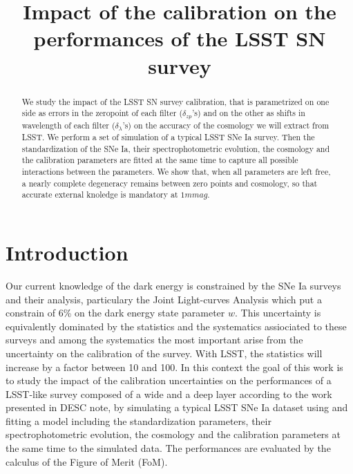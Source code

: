 \documentclass[\docopts]{\docclass}
\begin{document}
\title{ Impact of the calibration on the performances of the LSST SN survey }

\maketitlepre

\begin{abstract}
We study the impact of the LSST SN survey calibration, that is parametrized on one side as errors in the zeropoint of each filter ($\delta_{zp}$'s) and on the other as shifts in wavelength of each filter ($\delta_\lambda$'s) on the accuracy of the cosmology we will extract from LSST.
We perform a set of simulation of a typical LSST SNe Ia survey.
Then the standardization of the SNe Ia, their spectrophotometric evolution, the cosmology and the calibration parameters are fitted at the same time to capture all possible interactions between the parameters.
We show that, when all parameters are left free, a nearly complete degeneracy remains between zero points and cosmology, so that accurate external knoledge is mandatory at $1mmag$.
\end{abstract}


\maketitlepost

% 

\section{Introduction}
\label{sec:intro}

Our current knowledge of the dark energy is constrained by the SNe Ia surveys and their analysis, particulary the Joint Light-curves Analysis \cite{1401.4064} which put a constrain of 6\% on the dark energy state parameter $w$.
This uncertainty is equivalently dominated by the statistics and the systematics assiociated to these surveys and among the systematics the most important arise from the uncertainty on the calibration of the survey.
With LSST, the statistics will increase by a factor between 10 and 100. In this context the goal of this work is to study the impact of the calibration uncertainties on the performances of a LSST-like survey composed of a wide and a deep layer according to the work presented in \cite{SN-CADENCE} DESC note, by simulating a typical LSST SNe Ia dataset using  and fitting a model including the standardization parameters, their spectrophotometric evolution, the cosmology and the calibration parameters at the same time to the simulated data. The performances are evaluated by the calculus of the Figure of Merit (FoM).
\end{document}
